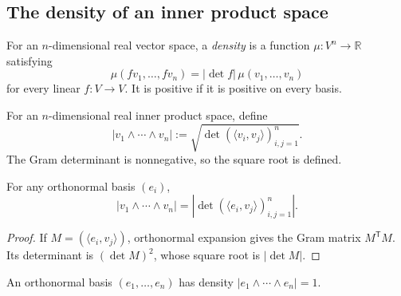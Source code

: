 \subsection{The density of an inner product space}

\begin{definition}
\label{def:density-vector-space}




For an $n$-dimensional real vector space, a \emph{density} is a function $\mu:V^n\to\mathbb R$ satisfying
\begin{equation}
\mu(fv_1,\ldots,fv_n)=|\det f|\,\mu(v_1,\ldots,v_n) \tag{B.14}
\end{equation}
for every linear $f:V\to V$. It is positive if it is positive on every basis.
\end{definition}

\begin{definition}
\label{def:density-pointwise}




For an $n$-dimensional real inner product space, define
\[
|v_1\wedge\cdots\wedge v_n|:=\sqrt{\det(\langle v_i,v_j\rangle)_{i,j=1}^n}.
\]
The Gram determinant is nonnegative, so the square root is defined.
\end{definition}

\begin{proposition}
\label{prop:density-abs-det}





For any orthonormal basis $(e_i)$,
\[
|v_1\wedge\cdots\wedge v_n|=\left|\det(\langle e_i,v_j\rangle)_{i,j=1}^n\right|.
\]
\end{proposition}

\begin{proof}

\sketch If $M=(\langle e_i,v_j\rangle)$, orthonormal expansion gives the Gram matrix $M^{\mathsf T}M$. Its determinant is $(\det M)^2$, whose square root is $|\det M|$.
\end{proof}

\begin{proposition}
\label{prop:density-value-one}





An orthonormal basis $(e_1,\ldots,e_n)$ has density $|e_1\wedge\cdots\wedge e_n|=1$.
\end{proposition}

